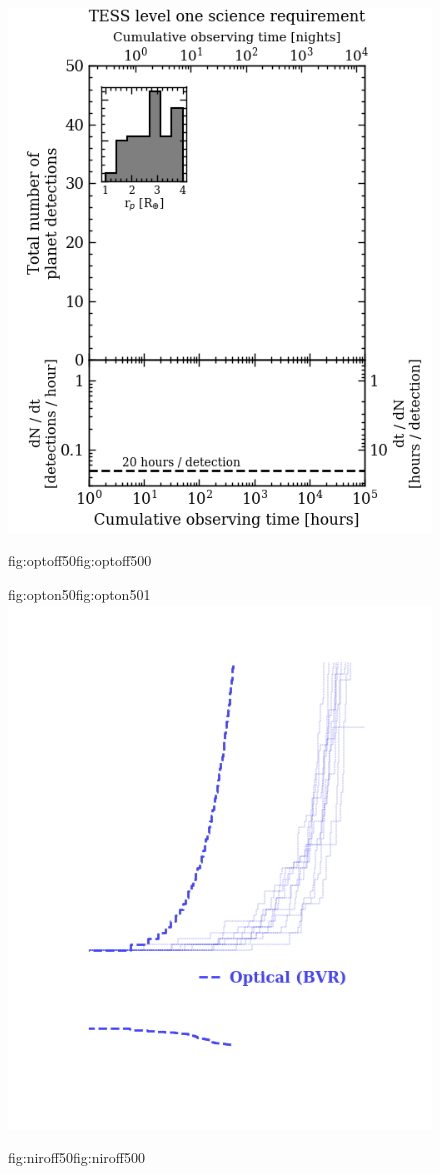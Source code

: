 \begin{figure}
  \centering
  \includegraphics[width=0.6\hsize]{figures/cumulativetobsGP_50random4_bkgd.png}%
  \hspace{-0.6\hsize}%
  \begin{ocg}{fig:optoff50}{fig:optoff50}{0}%
  \end{ocg}%
  \begin{ocg}{fig:opton50}{fig:opton50}{1}%
  \includegraphics[width=0.6\hsize]{figures/cumulativetobsGP_50random4_opt.png}%
  \end{ocg}
  \hspace{-0.6\hsize}%
  \begin{ocg}{fig:niroff50}{fig:niroff50}{0}%
  \end{ocg}%

\end{figure}
